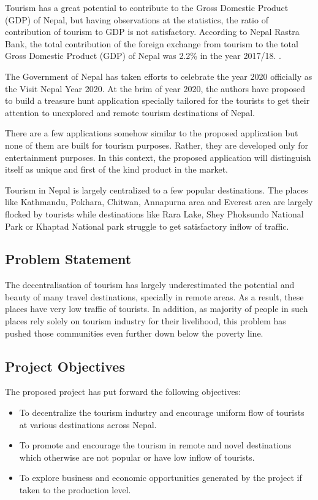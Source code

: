\documentclass[12pt, a4paper, oneside]{article}
\begin{document}
Tourism has a great potential to contribute to the Gross Domestic Product (GDP) of Nepal, but having observations at the statistics, the ratio of contribution of tourism to GDP is not satisfactory. According to Nepal Rastra Bank, the total contribution of the foreign exchange from tourism to the total Gross Domestic Product (GDP) of Nepal was 2.2\% in the year 2017/18. \cite{tourismstats}.

The Government of Nepal has taken efforts to celebrate the year 2020 officially as the Visit Nepal Year 2020. At the brim of year 2020, the authors have proposed to build a treasure hunt application specially tailored for the tourists to get their attention to unexplored and remote tourism destinations of Nepal. 

There are a few applications somehow similar to the proposed application but none of them are built for tourism purposes. Rather, they are developed only for entertainment purposes. In this context, the proposed application will distinguish itself as unique and first of the kind product in the market.

Tourism in Nepal is largely centralized to a few popular destinations. The places like Kathmandu, Pokhara, Chitwan, Annapurna area and Everest area are largely flocked by tourists while destinations like Rara Lake, Shey Phoksundo National Park or Khaptad National park struggle to get satisfactory inflow of traffic.

\subsection{Problem Statement}
The decentralisation of tourism has largely underestimated the potential and beauty of many travel destinations, specially in remote areas. As a result, these places have very low traffic of tourists. In addition, as majority of people in such places rely solely on tourism industry for their livelihood, this problem has pushed those communities even further down below the poverty line.

\subsection{Project Objectives}
The proposed project has put forward the following objectives:

\begin{itemize}
	\item To decentralize the tourism industry and encourage uniform flow of tourists at various destinations across Nepal.
	\item To promote and encourage the tourism in remote and novel destinations which otherwise are not popular or have low inflow of tourists.
	\item To explore business and economic opportunities generated by the project if taken to the production level.
\end{itemize}
\end{document}
